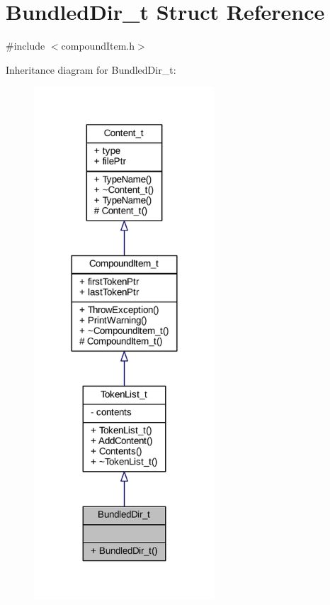 \hypertarget{struct_bundled_dir__t}{}\section{Bundled\+Dir\+\_\+t Struct Reference}
\label{struct_bundled_dir__t}


{\ttfamily \#include $<$compound\+Item.\+h$>$}



Inheritance diagram for Bundled\+Dir\+\_\+t\+:
\nopagebreak
\begin{figure}[H]
\begin{center}
\leavevmode
\includegraphics[width=191pt]{struct_bundled_dir__t__inherit__graph}
\end{center}
\end{figure}



